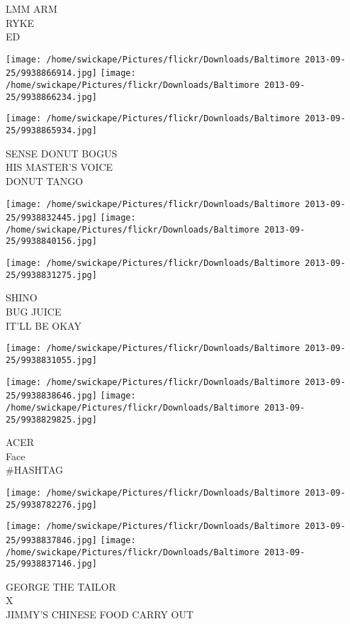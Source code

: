\documentclass[10pt,letterpaper]{article}
\begin{document}
LMM ARM\\
RYKE\\
ED
\pagebreak

\texttt{[image: /home/swickape/Pictures/flickr/Downloads/Baltimore 2013-09-25/9938866914.jpg]}
\texttt{[image: /home/swickape/Pictures/flickr/Downloads/Baltimore 2013-09-25/9938866234.jpg]}

\vspace{0.25in}
\texttt{[image: /home/swickape/Pictures/flickr/Downloads/Baltimore 2013-09-25/9938865934.jpg]}

SENSE DONUT BOGUS\\
HIS MASTER'S VOICE\\
DONUT TANGO
\pagebreak

\texttt{[image: /home/swickape/Pictures/flickr/Downloads/Baltimore 2013-09-25/9938832445.jpg]}
\texttt{[image: /home/swickape/Pictures/flickr/Downloads/Baltimore 2013-09-25/9938840156.jpg]}

\vspace{0.25in}
\texttt{[image: /home/swickape/Pictures/flickr/Downloads/Baltimore 2013-09-25/9938831275.jpg]}

SHINO\\
BUG JUICE\\
IT'LL BE OKAY
\pagebreak

\texttt{[image: /home/swickape/Pictures/flickr/Downloads/Baltimore 2013-09-25/9938831055.jpg]}

\vspace{0.25in}
\texttt{[image: /home/swickape/Pictures/flickr/Downloads/Baltimore 2013-09-25/9938838646.jpg]}
\texttt{[image: /home/swickape/Pictures/flickr/Downloads/Baltimore 2013-09-25/9938829825.jpg]}

ACER\\
Face\\
\#HASHTAG
\pagebreak

\texttt{[image: /home/swickape/Pictures/flickr/Downloads/Baltimore 2013-09-25/9938782276.jpg]}

\vspace{0.25in}
\texttt{[image: /home/swickape/Pictures/flickr/Downloads/Baltimore 2013-09-25/9938837846.jpg]}
\texttt{[image: /home/swickape/Pictures/flickr/Downloads/Baltimore 2013-09-25/9938837146.jpg]}

GEORGE THE TAILOR\\
X\\
JIMMY'S CHINESE FOOD CARRY OUT
\pagebreak
\end{document}
